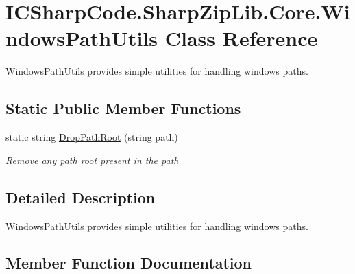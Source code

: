 \hypertarget{class_i_c_sharp_code_1_1_sharp_zip_lib_1_1_core_1_1_windows_path_utils}{}\section{I\+C\+Sharp\+Code.\+Sharp\+Zip\+Lib.\+Core.\+Windows\+Path\+Utils Class Reference}
\label{class_i_c_sharp_code_1_1_sharp_zip_lib_1_1_core_1_1_windows_path_utils}


\hyperlink{class_i_c_sharp_code_1_1_sharp_zip_lib_1_1_core_1_1_windows_path_utils}{Windows\+Path\+Utils} provides simple utilities for handling windows paths.  


\subsection*{Static Public Member Functions}
\begin{DoxyCompactItemize}
\item 
static string \hyperlink{class_i_c_sharp_code_1_1_sharp_zip_lib_1_1_core_1_1_windows_path_utils_afdfb0a4286fd5520aae37658288846bf}{Drop\+Path\+Root} (string path)
\begin{DoxyCompactList}\small\item\em Remove any path root present in the path \end{DoxyCompactList}\end{DoxyCompactItemize}


\subsection{Detailed Description}
\hyperlink{class_i_c_sharp_code_1_1_sharp_zip_lib_1_1_core_1_1_windows_path_utils}{Windows\+Path\+Utils} provides simple utilities for handling windows paths. 



\subsection{Member Function Documentation}
\mbox{\label{class_i_c_sharp_code_1_1_sharp_zip_lib_1_1_core_1_1_windows_path_utils_afdfb0a4286fd5520aae37658288846bf}} 
